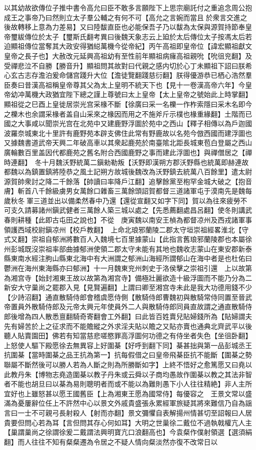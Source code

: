 以其幼故欲傳位子推中書令高允曰臣不敢多言願陛下上思宗廟託付之重追念周公抱成王之事帝乃曰然則立太子羣公輔之有何不可【高允之言婉而當且於衆言交進之後故轉移上意為力差易】又曰陸馛直臣也必能保吾子乃以馛為太保與源賀持節奉皇帝璽紱傳位於太子【璽斯氏翻考異曰後魏天象志云上廹於太后傳位太子按馮太后若迫顯祖傳位當奪其大政安得猶縂萬機今從帝紀】丙午高祖即皇帝位【諱宏顯祖獻文皇帝之長子也】大赦改元延興高祖幼有至性前年顯祖病癕高祖親吮【吮徂兖翻】及受禪悲泣不自勝【勝音升】顯祖問其故對曰代親之感内切於心丁未顯祖下詔曰朕希心玄古志存澹泊爰命儲宫踐升大位【澹徒覽翻踐慈衍翻】朕得優游恭已栖心浩然羣臣奏曰昔漢高祖稱皇帝尊其父為太上皇明不統天下也【見十一卷漢高帝六年】今皇帝幼冲萬機大政猶宜陛下總之謹上尊號曰太上皇帝【太上皇帝之號始此上時掌翻】顯祖從之巳酉上皇徙居崇光宫采椽不斷【徐廣曰采一名櫟一作柞索隱曰采木名即今之櫟木也余謂采椽者盖自山采來之椽因而用之不施斧斤示樸也椽重緣翻】土階而已國之大事咸以聞崇光宫在北苑中又建鹿野浮圖於苑中之西山【釋子相傳以為戶迦國波羅奈城東北十里許有鹿野苑本辟支佛住此常有野鹿故以名苑今倣西國而建浮圖也又據魏書道武帝天興二年破高車以其衆起鹿苑於南臺隂北距長城東苞白登屬之西山廣輪數百里盖因代都鹿苑之舊名附合西國鹿野之事而建此浮圖也】與禪僧居之【禪時連翻】　冬十月魏沃野統萬二鎭勑勒叛【沃野即漢朔方郡沃野縣也統萬即赫連故都魏以為鎮置鎮將陸恭之風土記朔方故城後魏改為沃野鎮去統萬八百餘里】遣太尉源賀帥衆討之降二千餘落【帥讀曰率降戶江翻】追擊餘黨至枹罕金城大破之【抱音膚】斬首八千餘級虜男女萬餘口雜畜三萬餘頭詔賀都督三道諸軍屯于漠南先是魏每歲秋冬軍三道並出以備柔然春中乃還【還從宣翻又如字下同】賀以為往來疲勞不可支久請募諸州鎭武健者三萬餘人築三城以處之【先悉薦翻處昌呂翻】使冬則講武春則耕種【此即古屯田之說也】不從　庚寅魏以南安王楨為都督凉州及西戎諸軍事領護西域校尉鎭凉州【校戶教翻】　上命北琅邪蘭陵二郡太守垣崇祖經畧淮北【守式又翻】崇祖自郁洲將數百人入魏境七百里據蒙山【此指言舊琅邪蘭陵郡也本屬徐州彭城既沒崇祖率部曲據郁洲使領二郡太守未能有其地也魏收志蒙山在東安郡新泰縣東南水經注朐山縣東北海中有大洲謂之郁洲山海經所謂郁山在海中者是也杜佑曰鬱洲在海州東海縣亦曰郁洲】十一月魏東兖州刺史于洛侯擊之崇祖引還　上以故第為湘宫寺【始封湘東王故以故第為湘宫寺】備極壯麗欲造十級浮圖而不能乃分為二新安大守巢尚之罷郡入見【見賢遍翻】上謂曰卿至湘宫寺未此是我大功德用錢不少【少詩沼翻】通直散騎侍郎會稽虞愿侍側【散騎侍郎曹魏初與散騎常侍同置至晉武帝置員外散騎侍郎及元帝太興元年使員外二人與散騎侍郎同員直故謂之通直散騎侍郎後增為四人散悉亶翻騎奇寄翻會工外翻】曰此皆百姓賣兒貼婦錢所為【貼婦謂夫先有婦苦於上之征求而不能贍縱之外求淫夫貼以贍之又貼亦賣也通典北齊武平以後聽人貼賣園田】佛若有知當慈悲嗟愍罪高浮圖何功德之有侍坐者失色【坐徂卧翻】上怒使人驅下殿愿徐去無異容上好圍棊【好呼到翻下同】棊甚拙與第一品彭城丞王抗圍棊【當時圍棊之品王抗為第一】抗每假借之曰皇帝飛棊臣抗不能斷【圍棊之勢聯屬不斷然後可以勝人若為人斷之則為所勝斷如字】上終不悟好之愈篤愿又曰堯以此教丹朱【博物志堯造圍棊以教子丹朱或云舜以子商均愚故作圍棊以教之其法非智者不能也胡旦曰以棊為易則聰明者而或不能以為難則愚下小人往往精絶】非人主所宜好也上雖怒甚以愿王國舊臣【上為湘東王愿為國常侍】每優容之　王景文常以盛滿為憂屢辭位任上不許然中心以景文外戚貴盛張永累經軍旅疑其將來難信乃自為謡言曰一士不可親弓長射殺人【射而亦翻】景文彌懼自表解揚州情甚切至詔報曰人居貴要但問心若為耳【言但問其存心何如耳】大明之世巢徐二戴位不過執戟權亢人主【巢謂巢尚之徐謂徐爰二戴謂法興明寶亢口浪翻高也】今袁粲作僕射領選【選須絹翻】而人往往不知有粲粲遷為令居之不疑人情向粲淡然亦復不改常日以